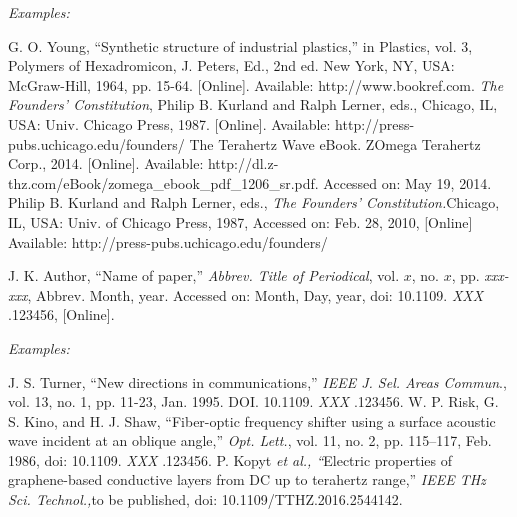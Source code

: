 \documentclass[journal,twoside,web]{ieeecolor}
\begin{document}
{\it Examples:}{\vadjust{\vspace*{-2.5em}}}

\begin{thebibliography}{00}
 G. O. Young, ``Synthetic structure of industrial plastics,'' in Plastics, vol. 3, Polymers of Hexadromicon, J. Peters, Ed., 2nd ed. New York, NY, USA: McGraw-Hill, 1964, pp. 15-64. [Online]. Available:  {http://www.bookref.com}.
 {\it The Founders' Constitution}, Philip B. Kurland and Ralph Lerner, eds., Chicago, IL, USA: Univ. Chicago Press, 1987. [Online]. Available:  {http://press-pubs.uchicago.edu/founders/}
 The Terahertz Wave eBook. ZOmega Terahertz Corp., 2014. [Online]. Available:  {http://dl.z-thz.com/eBook/zomega\_ebook\_pdf\_1206\_sr.pdf}. Accessed on: May 19, 2014.
 Philip B. Kurland and Ralph Lerner, eds., {\it The Founders' Constitution.}Chicago, IL, USA: Univ. of Chicago Press, 1987, Accessed on: Feb. 28, 2010, [Online] Available:  {http://press-pubs.uchicago.edu/founders/}
\end{thebibliography}


\noindent J. K. Author, ``Name of paper,'' {\it Abbrev. Title of Periodical}, vol. $x$, no. $x$, pp. {\it xxx-xxx}, Abbrev. Month, year.
Accessed on: Month, Day, year, doi:  {10.1109.} {{\it
XXX}} {.123456}, [Online].

{\it Examples:}{\vadjust{\vspace*{-2.5em}}}

\begin{thebibliography}{00}
 J. S. Turner, ``New directions in communications,'' {\it IEEE J. Sel. Areas Commun}., vol. 13, no. 1, pp. 11-23, Jan. 1995. DOI.  {10.1109.} {{\it XXX}} {.123456}.
 W. P. Risk, G. S. Kino, and H. J. Shaw, ``Fiber-optic frequency shifter using a surface acoustic wave incident at an oblique angle,'' {\it Opt. Lett.}, vol. 11, no. 2, pp. 115--117, Feb. 1986, doi: {10.1109.} {{\it XXX}} {.123456}.
 P. Kopyt {\it \textit{et al.}, ``}Electric properties of graphene-based conductive layers from DC up to terahertz range,'' {\it IEEE THz Sci. Technol.,}to be published, doi:  {10.1109/TTHZ.2016.2544142}.
\end{thebibliography}

\end{document}
